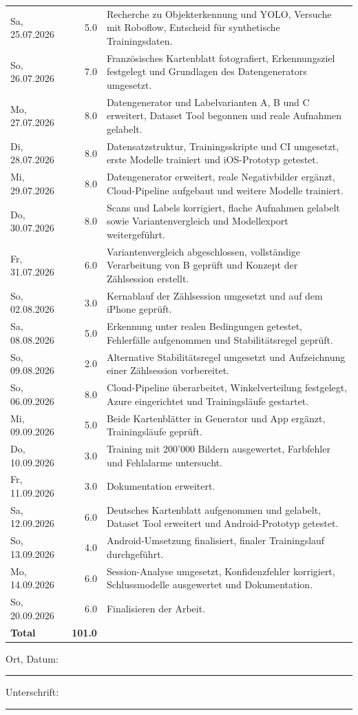 \documentclass[11pt,a4paper]{scrartcl}
\begin{document}
\begin{longtable}{@{}l r >{\raggedright\arraybackslash}p{\dimexpr\textwidth-6.4cm\relax}@{}}
Sa, 25.07.2026 & 5.0 &
Recherche zu Objekterkennung und YOLO, Versuche mit Roboflow, Entscheid für
synthetische Trainingsdaten. \\
So, 26.07.2026 & 7.0 &
Französisches Kartenblatt fotografiert, Erkennungsziel festgelegt und
Grundlagen des Datengenerators umgesetzt. \\
Mo, 27.07.2026 & 8.0 &
Datengenerator und Labelvarianten A, B und C erweitert, Dataset Tool begonnen
und reale Aufnahmen gelabelt. \\
Di, 28.07.2026 & 8.0 &
Datensatzstruktur, Trainingsskripte und CI umgesetzt, erste Modelle trainiert
und iOS-Prototyp getestet. \\
Mi, 29.07.2026 & 8.0 &
Datengenerator erweitert, reale Negativbilder ergänzt, Cloud-Pipeline
aufgebaut und weitere Modelle trainiert. \\
Do, 30.07.2026 & 8.0 &
Scans und Labels korrigiert, flache Aufnahmen gelabelt sowie
Variantenvergleich und Modellexport weitergeführt. \\
Fr, 31.07.2026 & 6.0 &
Variantenvergleich abgeschlossen, vollständige Verarbeitung von B geprüft
und Konzept der Zählsession erstellt. \\
So, 02.08.2026 & 3.0 &
Kernablauf der Zählsession umgesetzt und auf dem iPhone geprüft. \\
Sa, 08.08.2026 & 5.0 &
Erkennung unter realen Bedingungen getestet, Fehlerfälle aufgenommen und
Stabilitätsregel geprüft. \\
So, 09.08.2026 & 2.0 &
Alternative Stabilitätsregel umgesetzt und Aufzeichnung einer Zählsession
vorbereitet. \\
So, 06.09.2026 & 8.0 &
Cloud-Pipeline überarbeitet, Winkelverteilung festgelegt, Azure eingerichtet
und Trainingsläufe gestartet. \\
Mi, 09.09.2026 & 5.0 &
Beide Kartenblätter in Generator und App ergänzt, Trainingsläufe geprüft. \\
Do, 10.09.2026 & 3.0 &
Training mit 200'000 Bildern ausgewertet, Farbfehler und Fehlalarme untersucht. \\
Fr, 11.09.2026 & 3.0 & Dokumentation erweitert. \\
Sa, 12.09.2026 & 6.0 &
Deutsches Kartenblatt aufgenommen und gelabelt, Dataset Tool erweitert und
Android-Prototyp getestet. \\
So, 13.09.2026 & 4.0 &
Android-Umsetzung finalisiert, finaler Trainingslauf durchgeführt. \\
Mo, 14.09.2026 & 6.0 &
Session-Analyse umgesetzt, Konfidenzfehler korrigiert, Schlussmodelle
ausgewertet und Dokumentation. \\
So, 20.09.2026 & 6.0 & Finalisieren der Arbeit. \\
\midrule
\textbf{Total} & \textbf{101.0} &  \\
\bottomrule
\end{longtable}

\vspace{2em}
\noindent
Ort, Datum: \rule{5cm}{0.4pt} \hfill Unterschrift: \rule{5cm}{0.4pt}
\end{document}
